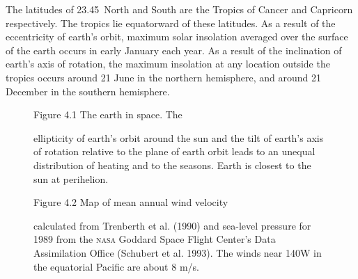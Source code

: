 The latitudes of 23.45\degrees\ North and South are the Tropics of
Cancer and Capricorn respectively. The tropics lie equatorward of
these latitudes. As a result of the eccentricity of earth's orbit,
maximum solar insolation averaged over the
surface of the earth occurs in early January each year. As a result of
the inclination of earth's axis of rotation, the maximum insolation at
any location outside the tropics occurs around 21 June in the northern
hemisphere, and around 21 December in the southern hemisphere.

\begin{figure}[t!]
\footnotesize
Figure 4.1 The earth in space. The \rule{0mm}{3ex}ellipticity of
earth's orbit around the sun and the tilt of earth's axis
of rotation relative to the plane of earth orbit leads to an unequal
distribution of heating and to the seasons. Earth is closest to the
sun at perihelion.
\label{fig:earthinspace}
\vspace{-4ex}
\end{figure}

\begin{figure}[b!]
\vspace{-2ex}
\footnotesize
Figure 4.2 Map of mean annual wind velocity
\rule{0 pt}{3 ex} calculated from Trenberth et al. (1990) and
sea-level pressure for 1989 from the \textsc{nasa} Goddard Space
Flight Center's Data Assimilation Office (Schubert et al. 1993). The
winds near 140\degrees W in the equatorial Pacific are about 8 m/s.
\label{fig:surfacewinds} %
\end{figure}

